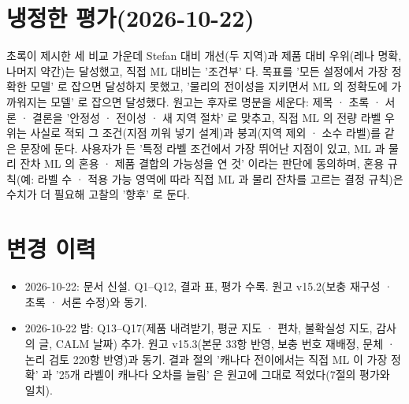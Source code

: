 \documentclass[10pt,a4paper]{article}
\begin{document}
\section{냉정한 평가(2026-10-22)}
초록이 제시한 세 비교 가운데 Stefan 대비 개선(두 지역)과 제품 대비 우위(레나 명확, 나머지 약간)는 달성했고, 직접 ML 대비는 '조건부' 다. 목표를 '모든 설정에서 가장 정확한 모델' 로 잡으면 달성하지 못했고, '물리의 전이성을 지키면서 ML 의 정확도에 가까워지는 모델' 로 잡으면 달성했다. 원고는 후자로 명분을 세운다: 제목 · 초록 · 서론 · 결론을 '안정성 · 전이성 · 새 지역 절차' 로 맞추고, 직접 ML 의 전량 라벨 우위는 사실로 적되 그 조건(지점 끼워 넣기 설계)과 붕괴(지역 제외 · 소수 라벨)를 같은 문장에 둔다. 사용자가 든 '특정 라벨 조건에서 가장 뛰어난 지점이 있고, ML 과 물리 잔차 ML 의 혼용 · 제품 결합의 가능성을 연 것' 이라는 판단에 동의하며, 혼용 규칙(예: 라벨 수 · 적용 가능 영역에 따라 직접 ML 과 물리 잔차를 고르는 결정 규칙)은 수치가 더 필요해 고찰의 '향후' 로 둔다.

\section{변경 이력}
\begin{itemize}\setlength{\itemsep}{1pt}
\item 2026-10-22: 문서 신설. Q1--Q12, 결과 표, 평가 수록. 원고 v15.2(보충 재구성 · 초록 · 서론 수정)와 동기.
\item 2026-10-22 밤: Q13--Q17(제품 내려받기, 평균 지도 · 편차, 불확실성 지도, 감사의 글, CALM 날짜) 추가. 원고 v15.3(본문 33항 반영, 보충 번호 재배정, 문체 · 논리 검토 220항 반영)과 동기. 결과 절의 '캐나다 전이에서는 직접 ML 이 가장 정확' 과 '25개 라벨이 캐나다 오차를 늘림' 은 원고에 그대로 적었다(7절의 평가와 일치).
\end{itemize}
\end{document}
